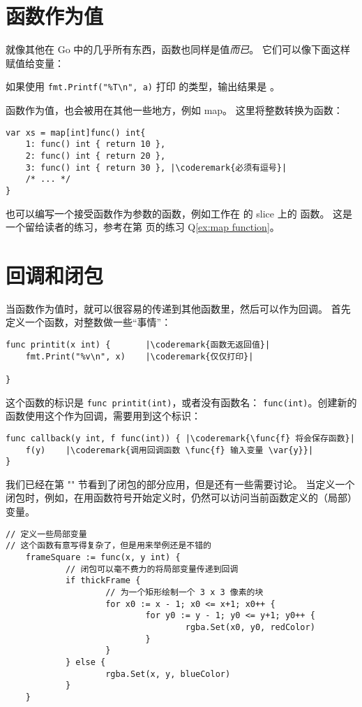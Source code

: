 \section{函数作为值}
\label{sec:functions as values}
就像其他在 Go 中的几乎所有东西，函数也同样是值\emph{而已}。
它们可以像下面这样赋值给变量：

如果使用 \lstinline{fmt.Printf("%T\n", a)} 打印  的类型，输出结果是 。

函数作为值，也会被用在其他一些地方，例如 map。
这里将整数转换为函数：
\begin{lstlisting}[caption=使用 map 的函数作为值]
var xs = map[int]func() int{
    1: func() int { return 10 },
    2: func() int { return 20 },
    3: func() int { return 30 }, |\coderemark{必须有逗号}|
    /* ... */
}
\end{lstlisting}
也可以编写一个接受函数作为参数的函数，例如工作在  的 slice 上的  函数。
这是一个留给读者的练习，参考在第 \pageref{ex:map function} 页的练习 Q\ref{ex:map function}。

\section{回调和闭包}
\label{sec:callbacks}
当函数作为值时，就可以很容易的传递到其他函数里，然后可以作为回调。
首先定义一个函数，对整数做一些“事情”：
\begin{lstlisting}
func printit(x int) {       |\coderemark{函数无返回值}|
    fmt.Print("%v\n", x)    |\coderemark{仅仅打印}|

}
\end{lstlisting}
这个函数的标识是 \lstinline{func printit(int)}，或者没有函数名：
\mbox{\lstinline{func(int)}}。创建新的函数使用这个作为回调，需要用到这个标识：
\begin{lstlisting}
func callback(y int, f func(int)) { |\coderemark{\func{f} 将会保存函数}|
    f(y)    |\coderemark{调用回调函数 \func{f} 输入变量 \var{y}}|
}
\end{lstlisting}
我们已经在第 "" 节看到了闭包的部分应用，但是还有一些需要讨论。
当定义一个闭包时，例如，在用函数符号开始定义时，仍然可以访问当前函数定义的（局部）变量。

\begin{lstlisting}
// 定义一些局部变量
// 这个函数有意写得复杂了，但是用来举例还是不错的
    frameSquare := func(x, y int) {
            // 闭包可以毫不费力的将局部变量传递到回调
            if thickFrame {
                    // 为一个矩形绘制一个 3 x 3 像素的块
                    for x0 := x - 1; x0 <= x+1; x0++ {
                            for y0 := y - 1; y0 <= y+1; y0++ {
                                    rgba.Set(x0, y0, redColor)
                            }
                    }
            } else {
                    rgba.Set(x, y, blueColor)
            }
    }
\end{lstlisting}

